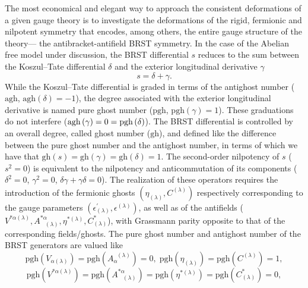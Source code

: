 \documentclass[a4paper,11pt]{article}
\begin{document}
The most economical and elegant way to approach the consistent deformations
of a given gauge theory is to investigate the deformations of the rigid,
fermionic and nilpotent symmetry that encodes, among others, the entire
gauge structure of the theory--- the antibracket-antifield BRST symmetry. In
the case of the Abelian free model under discussion, the BRST differential $%
s $ reduces to the sum between the Koszul--Tate differential $\delta $ and
the exterior longitudinal derivative $\gamma $%
\begin{equation}
s=\delta +\gamma .  \label{bf38}
\end{equation}
While the Koszul--Tate differential is graded in terms of the antighost
number ($\mathrm{agh}$, $\mathrm{agh}\left( \delta \right) =-1$), the degree
associated with the exterior longitudinal derivative is named pure ghost
number ($\mathrm{pgh}$, $\mathrm{pgh}\left( \gamma \right) =1$). These
graduations do not interfere ($\mathrm{agh}\left( \gamma \right) =0=\mathrm{%
pgh}\left( \delta \right) $). The BRST differential is controlled by an
overall degree, called ghost number ($\mathrm{gh}$), and defined like the
difference between the pure ghost number and the antighost number, in terms
of which we have that $\mathrm{gh}\left( s\right) =\mathrm{gh}\left( \gamma
\right) =\mathrm{gh}\left( \delta \right) =1$. The second-order nilpotency
of $s$ ($s^{2}=0$) is equivalent to the nilpotency and anticommutation of
its components ($\delta ^{2}=0$, $\gamma ^{2}=0$, $\delta \gamma +\gamma
\delta =0$). The realization of these operators requires the introduction of
the fermionic ghosts $\left( \eta _{(\lambda )},C^{(\lambda )}\right) $
respectively corresponding to the gauge parameters $\left( \epsilon
_{(\lambda )}^{\prime },\epsilon ^{(\lambda )}\right) $, as well as of the
antifields ($V^{*\alpha (\lambda )},A_{\;\;\;(\lambda )}^{*\alpha },\eta
^{*(\lambda )},C_{(\lambda )}^{*}$), with Grassmann parity opposite to that
of the corresponding fields/ghosts. The pure ghost number and antighost
number of the BRST generators are valued like
\begin{equation}
\mathrm{pgh}\left( V_{\alpha (\lambda )}\right) =\mathrm{pgh}\left(
A_{\alpha }^{\;\;(\lambda )}\right) =0,\;\mathrm{pgh}\left( \eta _{(\lambda
)}\right) =\mathrm{pgh}\left( C^{(\lambda )}\right) =1,  \label{bf39}
\end{equation}
\begin{equation}
\mathrm{pgh}\left( V^{*\alpha (\lambda )}\right) =\mathrm{pgh}\left(
A_{\;\;\;(\lambda )}^{*\alpha }\right) =\mathrm{pgh}\left( \eta ^{*(\lambda
)}\right) =\mathrm{pgh}\left( C_{(\lambda )}^{*}\right) =0,  \label{bf40}
\end{equation}
\end{document}
